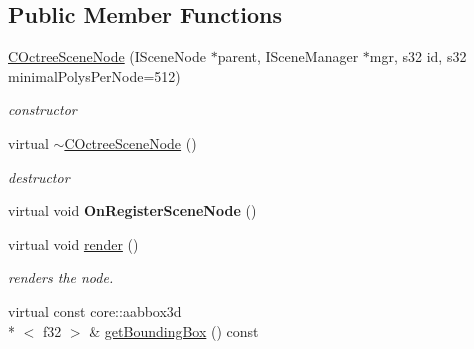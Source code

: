 \subsection*{Public Member Functions}
\begin{DoxyCompactItemize}
\item 
\hypertarget{classirr_1_1scene_1_1_c_octree_scene_node_adb2d39df980c0270c546ac5dcaf90bc4}{\hyperlink{classirr_1_1scene_1_1_c_octree_scene_node_adb2d39df980c0270c546ac5dcaf90bc4}{C\-Octree\-Scene\-Node} (I\-Scene\-Node $\ast$parent, I\-Scene\-Manager $\ast$mgr, s32 id, s32 minimal\-Polys\-Per\-Node=512)}\label{classirr_1_1scene_1_1_c_octree_scene_node_adb2d39df980c0270c546ac5dcaf90bc4}

\begin{DoxyCompactList}\small\item\em constructor \end{DoxyCompactList}\item 
\hypertarget{classirr_1_1scene_1_1_c_octree_scene_node_aafa52fbbe82b8e3ff37fcf621ed3cf51}{virtual \hyperlink{classirr_1_1scene_1_1_c_octree_scene_node_aafa52fbbe82b8e3ff37fcf621ed3cf51}{$\sim$\-C\-Octree\-Scene\-Node} ()}\label{classirr_1_1scene_1_1_c_octree_scene_node_aafa52fbbe82b8e3ff37fcf621ed3cf51}

\begin{DoxyCompactList}\small\item\em destructor \end{DoxyCompactList}\item 
\hypertarget{classirr_1_1scene_1_1_c_octree_scene_node_a8370488a4c8526ee28b86754361cdc78}{virtual void {\bfseries On\-Register\-Scene\-Node} ()}\label{classirr_1_1scene_1_1_c_octree_scene_node_a8370488a4c8526ee28b86754361cdc78}

\item 
\hypertarget{classirr_1_1scene_1_1_c_octree_scene_node_ad0097e7c9423081ae2753ee6fc91ec05}{virtual void \hyperlink{classirr_1_1scene_1_1_c_octree_scene_node_ad0097e7c9423081ae2753ee6fc91ec05}{render} ()}\label{classirr_1_1scene_1_1_c_octree_scene_node_ad0097e7c9423081ae2753ee6fc91ec05}

\begin{DoxyCompactList}\small\item\em renders the node. \end{DoxyCompactList}\item 
\hypertarget{classirr_1_1scene_1_1_c_octree_scene_node_a057c75f04fb7c7841a76fc7e1e5942d6}{virtual const core\-::aabbox3d\\*
$<$ f32 $>$ \& \hyperlink{classirr_1_1scene_1_1_c_octree_scene_node_a057c75f04fb7c7841a76fc7e1e5942d6}{get\-Bounding\-Box} () const }\label{classirr_1_1scene_1_1_c_octree_scene_node_a057c75f04fb7c7841a76fc7e1e5942d6}


\end{DoxyCompactItemize}
